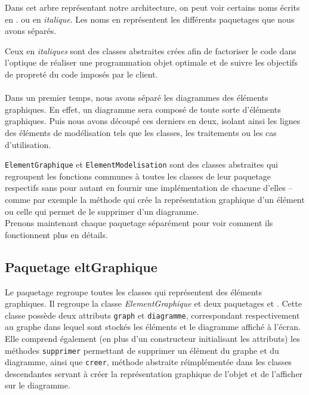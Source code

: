 \documentclass[12pt,a4paper,oneside]{book}
\begin{document}
		Dans cet arbre représentant notre architecture, on peut voir certains noms écrits en . 
		ou en \textit{italique}. 
		Les noms en  représentent les différents paquetages que nous avons séparés.
		
		Ceux en \textit{italiques} sont des classes abstraites crées afin de factoriser le code dans l'optique de réaliser une programmation objet optimale 
		et de suivre les objectifs de propreté du code imposés par le client.\vspace{2px}
	\paragraph{}	
		Dans un premier temps, nous avons séparé les diagrammes des éléments graphiques. En effet, un diagramme sera composé de
		toute sorte d'éléments graphiques. Puis nous avons découpé ces derniers en deux, isolant ainsi les lignes des éléments
		de modélisation tels que les classes, les traitements ou les cas d'utilisation.\vspace{2px}
		
		\texttt{ElementGraphique} et \texttt{ElementModelisation} sont des classes abstraites qui regroupent les fonctions communes
		à toutes les classes de leur paquetage respectifs sans pour autant en fournir une implémentation de chacune d'elles -- comme par exemple la méthode qui crée la
		représentation graphique d'un élément ou celle qui permet de le supprimer d'un diagramme.\\ 
	Prenons maintenant chaque paquetage séparément pour voir comment ils fonctionnent plus en détails.
	\subsection{Paquetage eltGraphique}
	Le paquetage  regroupe toutes les classes qui représentent des éléments graphiques. Il regroupe la classe 
	\textit{ElementGraphique} et deux paquetages  et . Cette classe possède deux attributs 
	\texttt{graph} et \texttt{diagramme}, correspondant respectivement au graphe dans lequel sont stockés les éléments 
	et le diagramme affiché à l'écran. Elle comprend également (en plus d'un constructeur initialisant les attributs) 
	les méthodes \texttt{supprimer} permettant de supprimer un élément du graphe et du diagramme, ainsi que \texttt{creer}, 
	méthode abstraite réimplémentée dans les classes descendantes servant à créer la représentation graphique de l'objet 
	et de l'afficher sur le diagramme.
\end{document}
